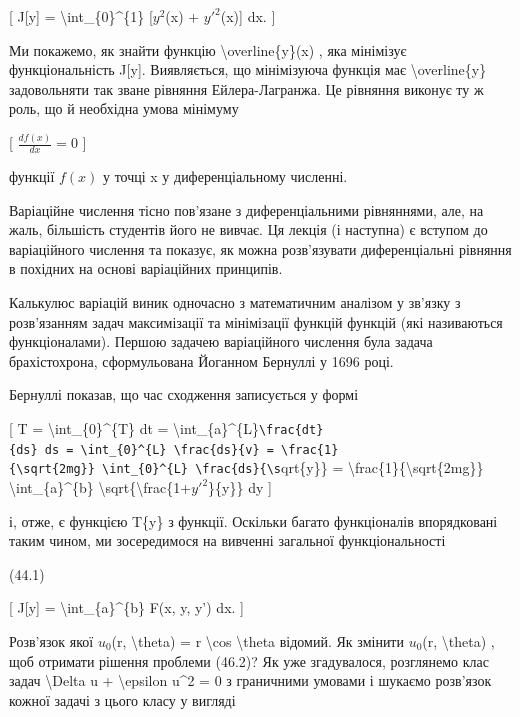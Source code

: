 \documentclass[
]{article}
\begin{document}
{{{{[} J{[}y{]} = \textbackslash int\_\{0\}\^{}\{1\} {[}\(y^{2}\)(x) +
\(y'^{2}\)(x){]} dx. {]}

Ми покажемо, як знайти функцію \textbackslash overline\{y\}(x) , яка
мінімізує функціональність J{[}y{]}. Виявляється, що мінімізуюча функція
має \textbackslash overline\{y\} задовольняти так зване рівняння
Ейлера-Лагранжа. Це рівняння виконує ту ж роль, що й необхідна умова
мінімуму

{[} \(\frac{df(x)}{dx} = 0\) {]}

функції \(f(x)\) у точці x у диференціальному численні.

Варіаційне числення тісно пов'язане з диференціальними рівняннями, але,
на жаль, більшість студентів його не вивчає. Ця лекція (і наступна) є
вступом до варіаційного числення та показує, як можна розв'язувати
диференціальні рівняння в похідних на основі варіаційних принципів.

Калькулюс варіацій виник одночасно з математичним аналізом у зв'язку з
розв'язанням задач максимізації та мінімізації функцій функцій (які
називаються функціоналами). Першою задачею варіаційного числення була
задача брахістохрона, сформульована Йоганном Бернуллі у 1696 році.

Бернуллі показав, що час сходження записується у формі

{[} T = \textbackslash int\_\{0\}\^{}\{T\} dt =
\textbackslash int\_\{a\}\^{}\{L\}\texttt{\textbackslash{}frac\{dt\}\{ds\}\ ds\ =\ \textbackslash{}int\_\{0\}\^{}\{L\}\ \textbackslash{}frac\{ds\}\{v\}\ =\ \textbackslash{}frac\{1\}\{\textbackslash{}sqrt\{2mg\}\}\ \textbackslash{}int\_\{0\}\^{}\{L\}\ \textbackslash{}frac\{ds\}\{\textbackslash{}s}qrt\{y\}\}
= \textbackslash frac\{1\}\{\textbackslash sqrt\{2mg\}\}
\textbackslash int\_\{a\}\^{}\{b\}
\textbackslash sqrt\{\textbackslash frac\{1+\(y'^{2}\)\}\{y\}\} dy {]}

і, отже, є функцією T\{y\} з функції. Оскільки багато функціоналів
впорядковані таким чином, ми зосередимося на вивченні загальної
функціональності

(44.1)

{[} J{[}y{]} = \textbackslash int\_\{a\}\^{}\{b\} F(x, y, y') dx. {]}

Розв'язок якої \(u_0\)(r, \textbackslash theta) = r \textbackslash cos
\textbackslash theta відомий. Як змінити \(u_0\)(r,
\textbackslash theta) , щоб отримати рішення проблеми (46.2)? Як уже
згадувалося, розглянемо клас задач \textbackslash Delta u +
\textbackslash epsilon u\^{}2 = 0 з граничними умовами і шукаємо
розв'язок кожної задачі з цього класу у вигляді

}}}
\end{document}
